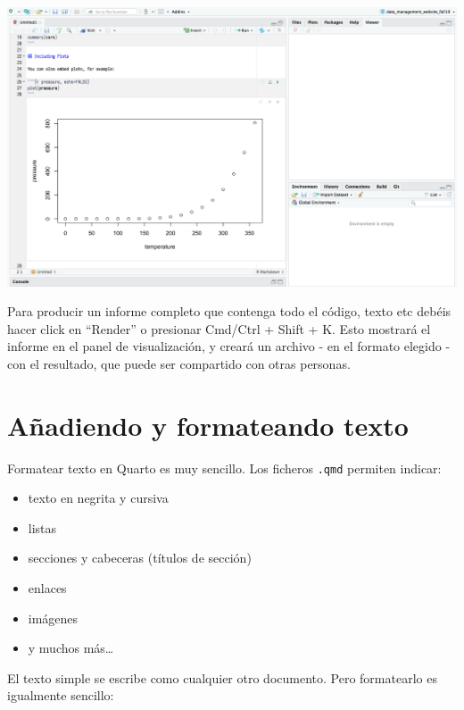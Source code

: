 \documentclass[
  letterpaper,
  DIV=11,
  numbers=noendperiod]{scrreprt}
\providecommand{\tightlist}{%
  \setlength{\itemsep}{0pt}\setlength{\parskip}{0pt}}\usepackage{longtable,booktabs,array}
\begin{document}
\includegraphics{images/02-intro-rmarkdown/run_chunk.png}

Para producir un informe completo que contenga todo el código, texto etc
debéis hacer click en ``Render'' o presionar Cmd/Ctrl + Shift + K. Esto
mostrará el informe en el panel de visualización, y creará un archivo -
en el formato elegido - con el resultado, que puede ser compartido con
otras personas.

\hypertarget{auxf1adiendo-y-formateando-texto}{%
\section{Añadiendo y formateando
texto}\label{auxf1adiendo-y-formateando-texto}}

Formatear texto en Quarto es muy sencillo. Los ficheros \texttt{.qmd}
permiten indicar:

\begin{itemize}
\tightlist
\item
  texto en negrita y cursiva
\item
  listas
\item
  secciones y cabeceras (títulos de sección)
\item
  enlaces
\item
  imágenes
\item
  y muchos más\ldots{}
\end{itemize}

El texto simple se escribe como cualquier otro documento. Pero
formatearlo es igualmente sencillo:
\end{document}

